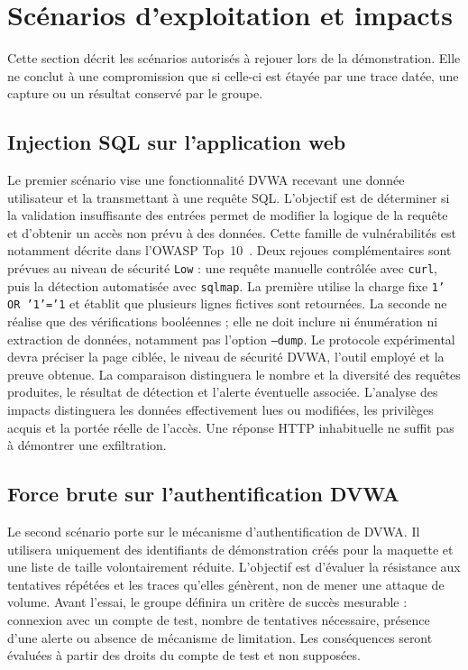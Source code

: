 \section{Scénarios d'exploitation et impacts}\label{sec:exploitation}

Cette section décrit les scénarios autorisés à rejouer lors de la démonstration.
Elle ne conclut à une compromission que si celle-ci est étayée par une trace datée, une capture ou un résultat conservé par le groupe.

\subsection{Injection SQL sur l'application web}\label{subsec:sqli}

Le premier scénario vise une fonctionnalité DVWA recevant une donnée utilisateur et la transmettant à une requête SQL\@.
L'objectif est de déterminer si la validation insuffisante des entrées permet de modifier la logique de la requête et d'obtenir un accès non prévu à des données.
Cette famille de vulnérabilités est notamment décrite dans l'OWASP Top~10~\cite{owasp-top10}.
Deux rejoues complémentaires sont prévues au niveau de sécurité \texttt{Low} : une requête manuelle contrôlée avec \texttt{curl}, puis la détection automatisée avec \texttt{sqlmap}. La première utilise la charge fixe \texttt{1' OR '1'='1} et établit que plusieurs lignes fictives sont retournées. La seconde ne réalise que des vérifications booléennes ; elle ne doit inclure ni énumération ni extraction de données, notamment pas l'option \texttt{--dump}.
Le protocole expérimental devra préciser la page ciblée, le niveau de sécurité DVWA, l'outil employé et la preuve obtenue. La comparaison distinguera le nombre et la diversité des requêtes produites, le résultat de détection et l'alerte éventuelle associée.
L'analyse des impacts distinguera les données effectivement lues ou modifiées, les privilèges acquis et la portée réelle de l'accès.
Une réponse HTTP inhabituelle ne suffit pas à démontrer une exfiltration.

\subsection{Force brute sur l'authentification DVWA}\label{subsec:bruteforce}

Le second scénario porte sur le mécanisme d'authentification de DVWA\@.
Il utilisera uniquement des identifiants de démonstration créés pour la maquette et une liste de taille volontairement réduite.
L'objectif est d'évaluer la résistance aux tentatives répétées et les traces qu'elles génèrent, non de mener une attaque de volume.
Avant l'essai, le groupe définira un critère de succès mesurable : connexion avec un compte de test, nombre de tentatives nécessaire, présence d'une alerte ou absence de mécanisme de limitation.
Les conséquences seront évaluées à partir des droits du compte de test et non supposées.

